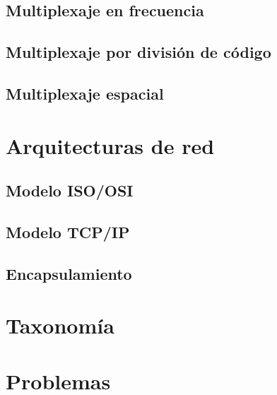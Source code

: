 \documentclass[
]{book}
\begin{document}
\hypertarget{multiplexaje-en-frecuencia}{%
\subsection{Multiplexaje en frecuencia}\label{multiplexaje-en-frecuencia}}

\hypertarget{multiplexaje-por-divisiuxf3n-de-cuxf3digo}{%
\subsection{Multiplexaje por división de código}\label{multiplexaje-por-divisiuxf3n-de-cuxf3digo}}

\hypertarget{multiplexaje-espacial}{%
\subsection{Multiplexaje espacial}\label{multiplexaje-espacial}}

\hypertarget{arquitecturas-de-red}{%
\section{Arquitecturas de red}\label{arquitecturas-de-red}}

\hypertarget{modelo-isoosi}{%
\subsection{Modelo ISO/OSI}\label{modelo-isoosi}}

\hypertarget{modelo-tcpip}{%
\subsection{Modelo TCP/IP}\label{modelo-tcpip}}

\hypertarget{encapsulamiento}{%
\subsection{Encapsulamiento}\label{encapsulamiento}}

\hypertarget{taxonomuxeda}{%
\section{Taxonomía}\label{taxonomuxeda}}

\hypertarget{problemas}{%
\section{Problemas}\label{problemas}}
\end{document}
